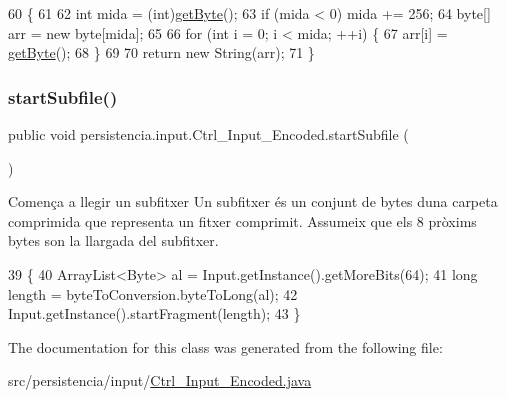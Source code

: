 \begin{DoxyCode}
60                             \{
61         
62         \textcolor{keywordtype}{int} mida = (int)\hyperlink{classpersistencia_1_1input_1_1Ctrl__Input__Encoded_a38ede6bc49251e77ae4be30ccc06457d}{getByte}();
63         \textcolor{keywordflow}{if} (mida < 0) mida += 256;
64         byte[] arr = \textcolor{keyword}{new} byte[mida];
65 
66         \textcolor{keywordflow}{for} (\textcolor{keywordtype}{int} i = 0; i < mida; ++i) \{
67             arr[i] = \hyperlink{classpersistencia_1_1input_1_1Ctrl__Input__Encoded_a38ede6bc49251e77ae4be30ccc06457d}{getByte}();
68         \}
69 
70         \textcolor{keywordflow}{return} \textcolor{keyword}{new} String(arr);
71     \}
\end{DoxyCode}
\mbox{\label{classpersistencia_1_1input_1_1Ctrl__Input__Encoded_ababb8ac0798194f61c4a77d1ddf5947e}} 
\subsubsection{\texorpdfstring{start\+Subfile()}{startSubfile()}}
{\footnotesize\ttfamily public void persistencia.\+input.\+Ctrl\+\_\+\+Input\+\_\+\+Encoded.\+start\+Subfile (\begin{DoxyParamCaption}{ }\end{DoxyParamCaption})\hspace{0.3cm}{\ttfamily [inline]}}



Comença a llegir un subfitxer Un subfitxer és un conjunt de bytes d\textquotesingle{}una carpeta comprimida que representa un fitxer comprimit. Assumeix que els 8 pròxims bytes son la llargada del subfitxer. 


\begin{DoxyCode}
39                                \{
40         ArrayList<Byte> al = Input.getInstance().getMoreBits(64);
41         \textcolor{keywordtype}{long} length = byteToConversion.byteToLong(al);
42         Input.getInstance().startFragment(length);
43     \}
\end{DoxyCode}


The documentation for this class was generated from the following file\+:\begin{DoxyCompactItemize}
\item 
src/persistencia/input/\hyperlink{Ctrl__Input__Encoded_8java}{Ctrl\+\_\+\+Input\+\_\+\+Encoded.\+java}\end{DoxyCompactItemize}
